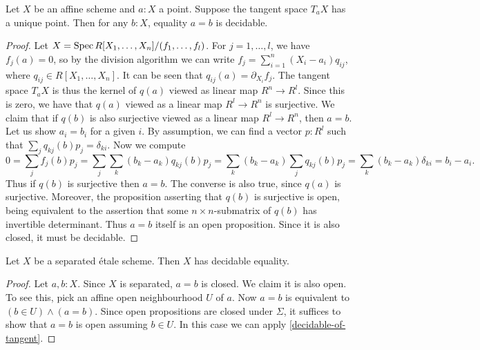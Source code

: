 \begin{proposition}%
	\label{decidable-of-tangent}
	Let $X$ be an affine scheme and $a : X$ a point. Suppose the tangent space
	$T_a X$ has a unique point. Then for any $b : X$, equality $a = b$ is decidable.
\end{proposition}

\begin{proof}
	Let $X = \operatorname{Spec} R[X_1,\ldots,X_n]/(f_1,\ldots,f_l)$.
	For $j = 1,\ldots,l$, we have $f_j(a) = 0$, so by the division algorithm
	we can write $f_j = \sum_{i = 1}^n (X_i-a_i)q_{ij}$, where
	$q_{ij} \in R[X_1,\ldots,X_n]$.
	It can be seen that $q_{ij}(a) = \partial_{X_i}f_j$.
	The tangent space $T_a X$ is thus the kernel of $q(a)$ viewed as 
	linear map $R^n \to R^l$.
	Since this is zero, we have that $q(a)$ viewed as a linear map
	$R^l \to R^n$ is surjective.
	We claim that if $q(b)$ is also surjective viewed as a linear map
	$R^l \to R^n$, then $a = b$.
	Let us show $a_i = b_i$ for a given $i$.
	By assumption, we can find a vector $p : R^l$ such
	that $\sum_j q_{kj}(b)p_j = \delta_{ki}$.
	Now we compute
	\[
	0 = \sum_j f_j(b)p_j 
	= \sum_j \sum_k (b_k-a_k)q_{kj}(b)p_j 
	= \sum_k (b_k-a_k) \sum_j q_{kj}(b)p_j 
	= \sum_k (b_k-a_k) \delta_{ki} 
	= b_i - a_i.
	\]
	Thus if $q(b)$ is surjective then $a = b$. The converse is also true,
	since $q(a)$ is surjective.
	Moreover, the proposition asserting that $q(b)$ is surjective
	is open, being equivalent to the assertion that some 
	$n \times n$-submatrix of $q(b)$ has invertible determinant.
	Thus $a = b$ itself is an open proposition. 
	Since it is also closed, it must be decidable.
\end{proof}

\begin{proposition}%
	Let $X$ be a separated \'{e}tale scheme. Then $X$ has decidable equality.
\end{proposition}

\begin{proof}
	Let $a, b : X$. Since $X$ is separated, $a = b$ is closed.
	We claim it is also open.
	To see this, pick an affine open neighbourhood $U$ of $a$.
	Now $a = b$ is equivalent to $(b \in U) \wedge (a = b)$.
	Since open propositions are closed under $\Sigma$,
	it suffices to show that $a = b$ is open assuming $b \in U$.
	In this case we can apply \cref{decidable-of-tangent}.
\end{proof}
